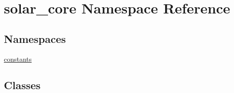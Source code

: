 \hypertarget{namespacesolar__core}{}\section{solar\+\_\+core Namespace Reference}
\label{namespacesolar__core}
\subsection*{Namespaces}
\begin{DoxyCompactItemize}
\item 
 \hyperlink{namespacesolar__core_1_1constants}{constants}
\end{DoxyCompactItemize}
\subsection*{Classes}
